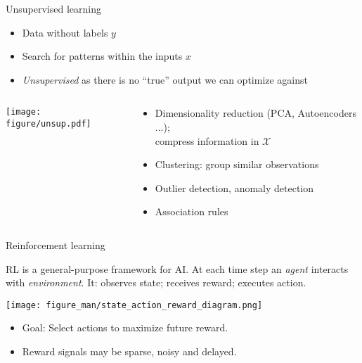 \begin{vbframe}{Unsupervised learning}
\begin{itemize}
  \item Data without labels $y$
  \item Search for patterns within the inputs $x$
  \item \textit{Unsupervised} as there is no \enquote{true} output
      we can optimize against
\end{itemize}

\lz

\begin{columns}
\begin{column}{0.45\textwidth}
\begin{center}
    \texttt{[image: figure/unsup.pdf]}
\end{center}
\end{column}
\begin{column}{0.55\textwidth}
\begin{itemize}
    \item Dimensionality reduction (PCA, Autoencoders ...);\\ 
        compress information in $\mathcal X$
    \item Clustering: group similar observations
    \item Outlier detection, anomaly detection
    \item Association rules
\end{itemize}
\end{column}
\end{columns}
\end{vbframe}

\begin{vbframe}{Reinforcement learning}

RL is a general-purpose framework for AI.
At each time step an \emph{agent} interacts with \emph{environment}. 
It: observes state; receives reward; executes action.

\begin{center}
  \texttt{[image: figure\_man/state\_action\_reward\_diagram.png]}
\end{center}


\begin{itemize}
\item Goal: Select actions to maximize future reward.
\item Reward signals may be sparse, noisy and delayed.
\end{itemize}

\end{vbframe}


